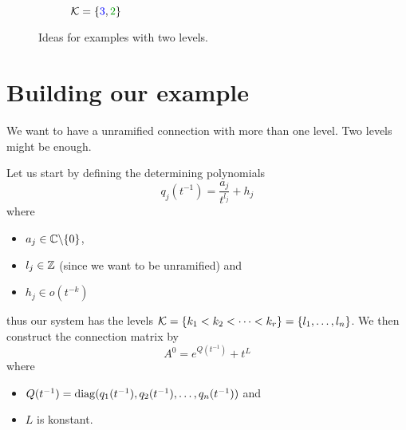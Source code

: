 \begin{figure}[!htbp]
\begin{subfigure}[b]{0.33\textwidth}
    \caption{$\cK=\{\textcolor{blue}{3},\textcolor{green!60!black}{2}\}$}
  \end{subfigure}
  \caption{Ideas for examples with two levels.}
\end{figure} %

\section{Building our example}
We want to have a unramified connection with more than one level. Two levels
might be enough. 

Let us start by defining the determining polynomials
\[
  q_j(t^{-1})=\frac{a_j}{t^{l_j}}+h_j
\]
where 
\begin{itemize}
  \item $a_j\in\mathbb{C}\backslash\{0\}$,
  \item $l_j\in\mathbb{Z}$ (since we want to be unramified) and
  \item $h_j\in o(t^{-k})$ 
\end{itemize}
thus our system has the levels $\mathcal{K}=\{k_1<k_2<\cdots<k_r\}=\{l_1,\dots,l_n\}$.
We then construct the connection matrix by
\[
  A^0=e^{Q(t^{-1})}+t^L
\]
where
\begin{itemize}
  \item $Q(t^{-1})=\operatorname{diag}(q_1(t^{-1}),q_2(t^{-1}),\dots,q_n(t^{-1}))$
    and
  \item $L$ is konstant.
\end{itemize}

